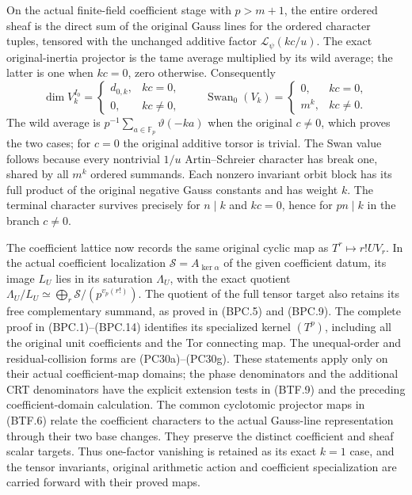 On the actual finite-field coefficient stage with \(p>m+1\),
the entire ordered sheaf is the direct sum of the original
Gauss lines for the ordered character tuples, tensored with
the unchanged additive factor \(\mathcal L_\psi(kc/u)\).
The exact original-inertia projector is the tame average
multiplied by its wild average; the latter is one when
\(kc=0\), zero otherwise.  Consequently
\[
 \dim V_k^{I_0}=\begin{cases}d_{0,k},&kc=0,\\0,&kc\ne0,
 \end{cases}
 \qquad
 \operatorname{Swan}_0(V_k)=
 \begin{cases}0,&kc=0,\\m^k,&kc\ne0.\end{cases}
 \tag{SPBT.3}\label{eq:spbt3}
\]
The wild average is \(p^{-1}\sum_{a\in\mathbb F_p}
\vartheta(-ka)\) when the original \(c\ne0\), which proves
the two cases; for \(c=0\) the original additive torsor is
trivial.  The Swan value follows because every nontrivial
\(1/u\) Artin--Schreier character has break one, shared by
all \(m^k\) ordered summands.  Each nonzero invariant orbit
block has its full product of the original negative Gauss
constants and has weight \(k\).  The terminal character
survives precisely for \(n\mid k\) and \(kc=0\), hence
for \(pn\mid k\) in the branch \(c\ne0\).

The coefficient lattice now records the same original cyclic
map as \(T^r\mapsto r!UV_r\).  In the actual coefficient
localization \(\mathscr S=A_{\ker\alpha}\) of the given
coefficient datum, its image \(L_U\) lies in its saturation
\(\Lambda_U\), with the exact quotient
\(\Lambda_U/L_U\simeq
       \bigoplus_r\mathscr S/(p^{v_p(r!)})\).
The quotient of the full tensor target also retains its
free complementary summand, as proved in (BPC.5) and (BPC.9).
The complete proof in (BPC.1)--(BPC.14) identifies its
specialized kernel \((T^p)\), including all the original
unit coefficients and the Tor connecting map.  The
unequal-order and residual-collision forms are
(PC30a)--(PC30g).  These statements apply only on their
actual coefficient-map domains; the phase denominators and
the additional CRT denominators have the explicit extension
tests in (BTF.9) and the preceding coefficient-domain
calculation.  The common cyclotomic projector maps in
(BTF.6) relate the coefficient characters to the actual
Gauss-line representation through their two base changes.
They preserve the distinct coefficient and sheaf scalar
targets.  Thus one-factor vanishing is retained as its exact
\(k=1\) case, and the tensor invariants, original arithmetic
action and coefficient specialization are carried forward
with their proved maps.

